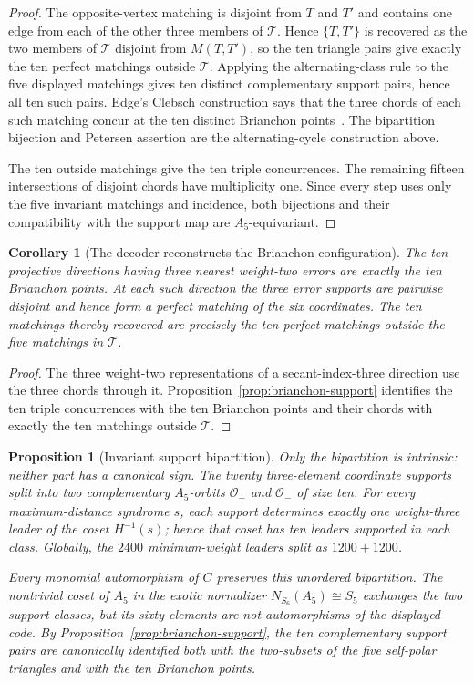 \documentclass[11pt]{article}
\newtheorem{proposition}[theorem]{Proposition}
\newtheorem{corollary}[theorem]{Corollary}
\theoremstyle{definition}
\theoremstyle{remark}
\begin{document}
\begin{proof}
The opposite-vertex matching is disjoint from $T$ and $T'$ and contains
one edge from each of the other three members of $\mathcal T$.
Hence $\{T,T'\}$ is recovered as the two members of $\mathcal T$ disjoint
from $M(T,T')$, so the ten triangle pairs give exactly the ten perfect
matchings outside $\mathcal T$. Applying the alternating-class rule to the
five displayed matchings gives ten distinct complementary support pairs,
hence all ten such pairs. Edge's Clebsch construction says that the
three chords of each such matching concur at the ten distinct Brianchon
points~\cite[\S\S19--20,30]{Edge1956}. The bipartition bijection and
Petersen assertion are the alternating-cycle construction above.

The ten outside matchings give the ten triple concurrences. The remaining
fifteen intersections of disjoint chords have multiplicity one. Since every
step uses only the five invariant matchings and incidence, both bijections
and their compatibility with the support map are $A_5$-equivariant.
\end{proof}

\begin{corollary}[The decoder reconstructs the Brianchon configuration]
\label{cor:decoder-brianchon}
The ten projective directions having three nearest weight-two errors are
exactly the ten Brianchon points.  At each such direction the three error
supports are pairwise disjoint and hence form a perfect matching of the six
coordinates.  The ten matchings thereby recovered are precisely the ten
perfect matchings outside the five matchings in $\mathcal T$.
\end{corollary}

\begin{proof}
The three weight-two representations of a secant-index-three direction use
the three chords through it.  Proposition~\ref{prop:brianchon-support}
identifies the ten triple concurrences with the ten Brianchon points and
their chords with exactly the ten matchings outside $\mathcal T$.
\end{proof}

\begin{proposition}[Invariant support bipartition]
\label{prop:invariant-support-bipartition}
Only the bipartition is intrinsic: neither part has a canonical sign. The
twenty three-element coordinate supports split into two complementary
$A_5$-orbits $\mathcal O_+$ and $\mathcal O_-$ of size ten. For every
maximum-distance syndrome $s$, each support determines exactly one
weight-three leader of the coset $H^{-1}(s)$; hence that coset has ten
leaders supported in each class. Globally, the $2400$ minimum-weight
leaders split as $1200+1200$.

Every monomial automorphism of $C$ preserves this unordered bipartition.
The nontrivial coset of $A_5$ in the exotic normalizer
$N_{S_6}(A_5)\cong S_5$ exchanges the two support classes, but its sixty
elements are not automorphisms of the displayed code. By
Proposition~\ref{prop:brianchon-support}, the ten complementary support
pairs are canonically identified both with the two-subsets of the five
self-polar triangles and with the ten Brianchon points.
\end{proposition}
\end{document}

